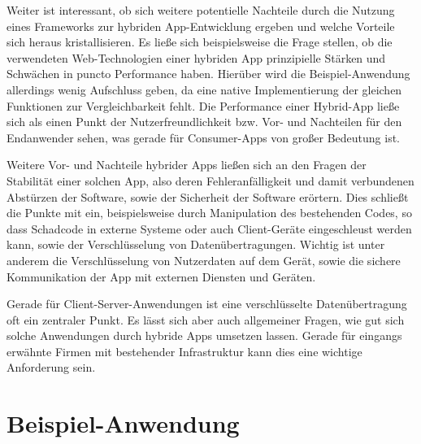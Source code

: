  	Weiter ist interessant, ob sich weitere potentielle Nachteile durch die Nutzung eines Frameworks zur hybriden App-Entwicklung ergeben und welche Vorteile sich heraus kristallisieren. 
 	Es ließe sich beispielsweise die Frage stellen, ob die verwendeten Web-Technologien einer hybriden App prinzipielle Stärken und Schwächen in puncto Performance haben. 
 	Hierüber wird die Beispiel-Anwendung allerdings wenig Aufschluss geben, da eine native Implementierung der gleichen Funktionen zur Vergleichbarkeit fehlt. Die Performance einer Hybrid-App ließe sich als einen Punkt der Nutzerfreundlichkeit bzw. Vor- und Nachteilen für den Endanwender sehen, was gerade für Consumer-Apps von großer Bedeutung ist.
 	
 	Weitere Vor- und Nachteile hybrider Apps ließen sich an den Fragen der Stabilität einer solchen App, also deren Fehleranfälligkeit und damit verbundenen Abstürzen der Software, sowie der Sicherheit der Software erörtern. Dies schließt die Punkte mit ein, beispielsweise durch Manipulation des bestehenden Codes, so dass Schadcode in externe Systeme oder auch Client-Geräte eingeschleust werden kann, sowie der Verschlüsselung von Datenübertragungen. 
 	Wichtig ist unter anderem die Verschlüsselung von Nutzerdaten auf dem Gerät, sowie die sichere Kommunikation der App mit externen Diensten und Geräten.
 	
 	Gerade für Client-Server-Anwendungen ist eine verschlüsselte Datenübertragung oft ein zentraler Punkt. Es lässt sich aber auch allgemeiner Fragen, wie gut sich solche Anwendungen durch hybride Apps umsetzen lassen. Gerade für eingangs erwähnte Firmen mit bestehender Infrastruktur kann dies eine wichtige Anforderung sein.
 	

\section{Beispiel-Anwendung}	\label{sec:bsp-app} 



